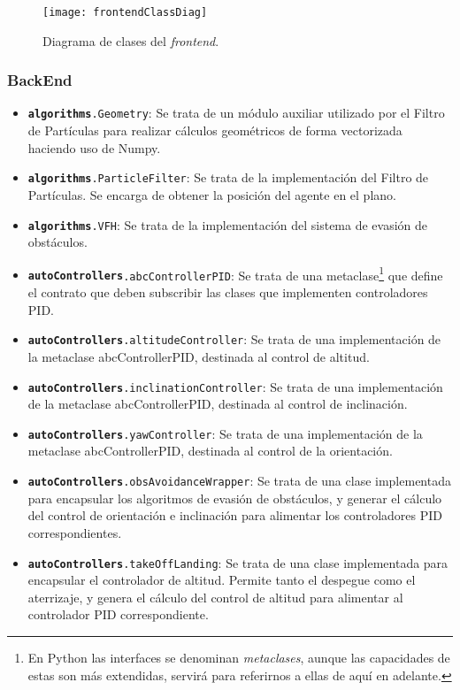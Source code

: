 \begin{figure}[H]
	\centering
	\texttt{[image: frontendClassDiag]}
	\caption[Diagrama de clases FrontEnd]{Diagrama de clases del \emph{frontend}.}\label{fig:frontendClassDiag}
\end{figure}



\subsubsection{BackEnd}

\begin{itemize}
\item \texttt{\textbf{algorithms}.Geometry}: Se trata de un módulo auxiliar utilizado por el Filtro de Partículas para realizar cálculos geométricos de forma vectorizada haciendo uso de Numpy.
\item \texttt{\textbf{algorithms}.ParticleFilter}: Se trata de la implementación del Filtro de Partículas. Se encarga de obtener la posición del agente en el plano.
\item \texttt{\textbf{algorithms}.VFH}: Se trata de la implementación del sistema de evasión de obstáculos. 
\item \texttt{\textbf{autoControllers}.abcControllerPID}: Se trata de una metaclase\footnote{En Python las interfaces se denominan \emph{metaclases}, aunque las capacidades de estas son más extendidas, servirá para referirnos a ellas de aquí en adelante.} que define el contrato que deben subscribir las clases que implementen controladores PID.
\item \texttt{\textbf{autoControllers}.altitudeController}: Se trata de una implementación de la metaclase abcControllerPID, destinada al control de altitud.
\item \texttt{\textbf{autoControllers}.inclinationController}: Se trata de una implementación de la metaclase abcControllerPID, destinada al control de inclinación.
\item \texttt{\textbf{autoControllers}.yawController}: Se trata de una implementación de la metaclase abcControllerPID, destinada al control de la orientación.
\item \texttt{\textbf{autoControllers}.obsAvoidanceWrapper}: Se trata de una clase implementada para encapsular los algoritmos de evasión de obstáculos, y generar el cálculo del control de orientación e inclinación para alimentar los controladores PID correspondientes.
\item \texttt{\textbf{autoControllers}.takeOffLanding}: Se trata de una clase implementada para encapsular el controlador de altitud. Permite tanto el despegue como el aterrizaje, y genera el cálculo del control de altitud para alimentar al controlador PID correspondiente. 

\end{itemize}
